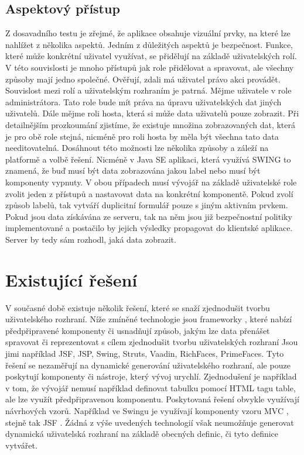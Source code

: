 \subsection{Aspektový přístup}
Z dosavadního testu je zřejmé, že aplikace obsahuje vizuální prvky, na které lze nahlížet z několika aspektů. Jedním z důležitých aspektů je bezpečnost. Funkce, které může konkrétní uživatel využívat, se přidělují na základě uživatelských rolí. V této souvislosti je mnoho přístupů jak role přidělovat a spravovat, ale všechny způsoby mají jedno společné. Ověřují, zdali má uživatel právo akci provádět. Souvislost mezi rolí a uživatelským rozhraním je patrná. Mějme uživatele v role administrátora. Tato role bude mít práva na úpravu uživatelských dat jiných uživatelů. Dále mějme roli hosta, která si může data uživatelů pouze zobrazit. Při detailnějším prozkoumání zjistíme, že existuje množina zobrazovaných dat, která je pro obě role stejná, nicméně pro roli hosta by měla být všechna tato data needitovatelná. Dosáhnout této možnosti lze několika způsoby a záleží na platformě a volbě řešení. Nicméně v Java SE aplikaci, která využívá SWING to znamená, že buď musí být data zobrazována jakou label nebo musí být komponenty vypnuty. V obou případech musí vývojář na základě uživatelské role zvolit jeden z přístupů a nastavovat data na konkrétní komponentě. Pokud zvolí způsob labelů, tak vytváří duplicitní formulář pouze s jiným aktivním prvkem. Pokud jsou data získávána ze serveru, tak na něm jsou již bezpečnostní politiky implementované a postačilo by jejich výsledky propagovat do klientské aplikace. Server by tedy sám rozhodl, jaká data zobrazit.
\section{Existující řešení}
V současné době existuje několik řešení, které se snaží zjednodušit tvorbu uživatelského rozhraní. Níže zmíněné technologie jsou frameworky \cite{framework}, které nabízí předpřipravené komponenty či usnadňují způsob, jakým lze data přenášet spravovat či reprezentovat s cílem zjednodušit tvorbu uživatelských rozhraní Jsou jimi například JSF, JSP, Swing, Struts, Vaadin, RichFaces, PrimeFaces. Tyto řešení se nezaměřují na dynamické generování uživatelského rozhraní, ale pouze poskytují komponenty či nástroje, který vývoj urychlí. Zjednodušení je například v tom, že vývojář nemusí například definovat tabulku pomocí HTML tagu table, ale lze využít předpřipravenou komponentu. Poskytovaná řešení obvykle využívají návrhových vzorů. Například ve Swingu je využívají komponenty vzoru MVC \cite{fowler}, stejně tak JSF \cite{javaEETutorial}. Žádná z výše uvedených technologií však neumožňuje generovat dynamická uživatelská rozhraní na základě obecných definic, či tyto definice vytvářet.
